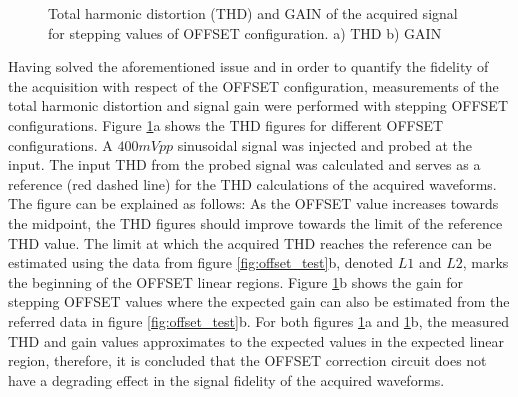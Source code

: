 \begin{figure}[h]
\centering
{}
\caption[]{Total harmonic distortion (THD) and GAIN of the acquired signal for stepping values of OFFSET configuration.  a) THD b) GAIN }
\label{fig:thd_gain}
\end{figure}

Having solved the aforementioned issue and in order to quantify the fidelity of the acquisition with respect of the OFFSET configuration, measurements of the total harmonic distortion and signal gain were performed with stepping OFFSET configurations. Figure \ref{fig:thd_gain}a shows the THD figures for different OFFSET configurations. A $400 mVpp$ sinusoidal signal was injected and probed at the input. The input THD from the probed signal was calculated and serves as a reference (red dashed line) for the THD calculations of the acquired waveforms. The figure can be explained as follows: As the OFFSET value increases towards the midpoint, the THD figures should improve towards the limit of the reference THD value. The limit at which the acquired THD reaches the reference can be estimated using the data from figure \ref{fig:offset_test}b, denoted $L1$ and $L2$, marks the beginning of the OFFSET linear regions. Figure \ref{fig:thd_gain}b shows the gain for stepping OFFSET values where the expected gain can also be estimated from the referred data in figure \ref{fig:offset_test}b. For both figures \ref{fig:thd_gain}a and \ref{fig:thd_gain}b, the measured THD and gain values approximates to the expected values in the expected linear region, therefore, it is concluded that the OFFSET correction circuit does not have a degrading effect in the signal fidelity of the acquired waveforms.  

